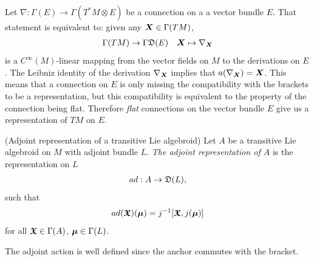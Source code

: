 \begin{example}
Let $\nabla: \Gamma(E) \to \Gamma(T^*M \otimes E)$ be a connection on a a vector bundle $E$. That statement is equivalent to: given any $\bm{X} \in \Gamma(TM)$,
\begin{align*}
    \Gamma(TM) \to \Gamma\mathfrak{D}(E) &&
    \bm{X} \mapsto \nabla_{\bm{X}}
\end{align*}
is a $C^\infty(M)$-linear mapping from the vector fields on $M$ to the derivations on $E$. The Leibniz identity of the derivation $\nabla_{\bm{X}}$ implies that $a(\nabla_{\bm{X}}) = \bm{X}$. This means that a connection on $E$ is only missing the compatibility with the brackets to be a representation, but this compatibility is equivalent to the property of the connection being flat. Therefore \emph{flat} connections on the vector bundle $E$ give us a representation of $TM$ on $E$.
\end{example}

\begin{definition}(Adjoint representation of a transitive Lie algebroid)\label{defnAdjointAct}
Let $A$ be a transitive Lie algebroid on $M$ with adjoint bundle $L$. \emph{The adjoint representation of $A$} is the representation on $L$
\begin{align*}
    ad: A \to \mathfrak{D}(L), 
\end{align*}
such that
\begin{align*}
     ad(\bm{\mathfrak{X}})(\bm{\mu}) = j^{-1}[\bm{\mathfrak{X}}, j(\bm{\mu})]
\end{align*}
for all $\bm{\mathfrak{X}} \in \Gamma(A)$, $\bm{\mu} \in \Gamma(L)$.
\end{definition}
The adjoint action is well defined since the anchor commutes with the bracket.

    
    
    
    

